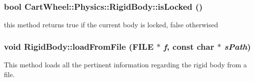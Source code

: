 \hypertarget{classCartWheel_1_1Physics_1_1RigidBody_a39b5754e21393bd02d0eb0e853692b84}{
\subsubsection[{isLocked}]{\setlength{\rightskip}{0pt plus 5cm}bool CartWheel::Physics::RigidBody::isLocked ()}}
\label{classCartWheel_1_1Physics_1_1RigidBody_a39b5754e21393bd02d0eb0e853692b84}
this method returns true if the current body is locked, false otherwised \hypertarget{classCartWheel_1_1Physics_1_1RigidBody_ad6e8faca968625e1e3d4eb24a780d2eb}{
\subsubsection[{loadFromFile}]{\setlength{\rightskip}{0pt plus 5cm}void RigidBody::loadFromFile (FILE $\ast$ {\em f}, \/  const char $\ast$ {\em sPath})}}
\label{classCartWheel_1_1Physics_1_1RigidBody_ad6e8faca968625e1e3d4eb24a780d2eb}
This method loads all the pertinent information regarding the rigid body from a file.

